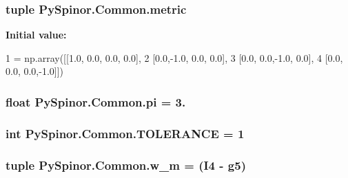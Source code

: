 \subsubsection[{metric}]{\setlength{\rightskip}{0pt plus 5cm}tuple Py\+Spinor.\+Common.\+metric}\label{namespace_py_spinor_1_1_common_a812175a058f2ca8f63c4dbbebbbc211e}
{\bfseries Initial value\+:}
\begin{DoxyCode}
1 = np.array([[1.0, 0.0, 0.0, 0.0],
2                 [0.0,-1.0, 0.0, 0.0],
3                     [0.0, 0.0,-1.0, 0.0],
4                     [0.0, 0.0, 0.0,-1.0]])
\end{DoxyCode}
\hypertarget{namespace_py_spinor_1_1_common_aee473092fbfbb05385c7680293c25985}{}
\subsubsection[{pi}]{\setlength{\rightskip}{0pt plus 5cm}float Py\+Spinor.\+Common.\+pi = 3.}\label{namespace_py_spinor_1_1_common_aee473092fbfbb05385c7680293c25985}
\hypertarget{namespace_py_spinor_1_1_common_a3e3becdff2a1ae7c86d40f14642a6276}{}
\subsubsection[{T\+O\+L\+E\+R\+A\+N\+C\+E}]{\setlength{\rightskip}{0pt plus 5cm}int Py\+Spinor.\+Common.\+T\+O\+L\+E\+R\+A\+N\+C\+E = 1}\label{namespace_py_spinor_1_1_common_a3e3becdff2a1ae7c86d40f14642a6276}
\hypertarget{namespace_py_spinor_1_1_common_abd9adfed59bb26d685727358c86c0699}{}
\subsubsection[{w\+\_\+m}]{\setlength{\rightskip}{0pt plus 5cm}tuple Py\+Spinor.\+Common.\+w\+\_\+m = ({\bf I4} -\/ {\bf g5})}\label{namespace_py_spinor_1_1_common_abd9adfed59bb26d685727358c86c0699}
\hypertarget{namespace_py_spinor_1_1_common_a50d86ef3514b190d72aa80914f0e880e}{}
